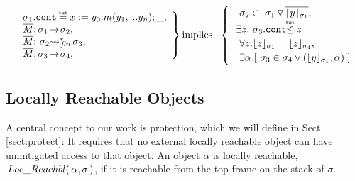 {{\begin{lemma}
 $  
   \left. %
   \begin{array}{l}  \ \strut \ \ \sigma_1.\prg{cont}\txteq x:= y_0.m(y_1,...y_n);\_ ,\\
    \ \strut \ \  \leadstoOrig {\Mtwo} {\sigma_1}   {\sigma_2} , \\
     \ \strut \ \  \leadstoBoundedStarFin  {\Mtwo}  {\sigma_2}  {\sigma_3}, \\
  \ \strut \ \  \leadstoOrig {\Mtwo} {\sigma_3}   {\sigma_4}, 
    \end{array} 
\right \}
 \mbox{implies} \ \ 
  \begin{cases}
     \ \strut \ \  \sigma_2 \in \PushS  {\interpret {\sigma_1} {y}} {\sigma_1},\\
     \ \strut \  \exists z.\ \sigma_3.\prg{cont}{\txtin z} \\
       \ \strut \ \       \forall z. \interpret {\sigma_1} {z} = \interpret {\sigma_4} {z},\\  
        \ \strut \ \       \exists \overline \alpha. [\ \sigma_3 \in  \PushSLong  {( {\interpret {\sigma_1} {y}},{\overline \alpha})} {\sigma_4} \ ]
    \end{cases} 
$
 \end{lemma}

}
  \subsection{{{Locally} Reachable  Objects}}

 {A central concept to our work is %
protection, which we will define in   Sect. \ref{sect:protect}: It requires that no external locally reachable object  
can have unmitigated access to that object.}
%
%
An object $\alpha$ is  locally reachable, $ \,Loc\_Reachbl(\,\alpha,\sigma\,) $, if it is reachable from the top frame on the stack of $\sigma$.
 
}
